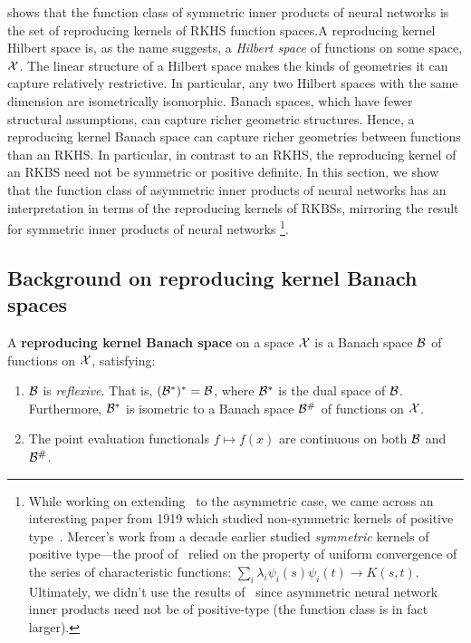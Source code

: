  shows that the function class of symmetric inner products of neural networks is the set of reproducing kernels of RKHS function spaces.A reproducing kernel Hilbert space is, as the name suggests, a \textit{Hilbert space} of functions on some space, ${\mathcal{X}}$. The linear structure of a Hilbert space makes the kinds of geometries it can capture relatively restrictive. In particular, any two Hilbert spaces with the same dimension are isometrically isomorphic. Banach spaces, which have fewer structural assumptions, can capture richer geometric structures. Hence, a reproducing kernel Banach space can capture richer geometries between functions than an RKHS. In particular, in contrast to an RKHS, the reproducing kernel of an RKBS need not be symmetric or positive definite. In this section, we show that the function class of asymmetric inner products of neural networks has an interpretation in terms of the reproducing kernels of RKBSs, mirroring the result for symmetric inner products of neural networks
\footnote{While working on extending~ to the asymmetric case, we came across an interesting paper from 1919 which studied non-symmetric kernels of positive type~\parencite{seelyNonSymmetricKernels1919}. Mercer's work from a decade earlier studied \textit{symmetric} kernels of positive type---the proof of~ relied on the property of uniform convergence of the series of characteristic functions: $\sum_i \lambda_i \psi_i(s)\psi_i(t) \to K(s,t)$. Ultimately, we didn't use the results of~\parencite{seelyNonSymmetricKernels1919} since asymmetric neural network inner products need not be of positive-type (the function class is in fact larger).}.

\subsection{Background on reproducing kernel Banach spaces}

\begin{definition}
    A \textbf{reproducing kernel Banach space} on a space ${\mathcal{X}}$ is a Banach space ${\mathcal{B}}$ of functions on ${\mathcal{X}}$, satisfying:
    \begin{enumerate}
        \item ${\mathcal{B}}$ is \textit{reflexive}. That is, $({\mathcal{B}}^*)^* = {\mathcal{B}}$, where ${\mathcal{B}}^*$ is the dual space of ${\mathcal{B}}$. Furthermore, ${\mathcal{B}}^*$ is isometric to a Banach space ${\mathcal{B}}^\#$ of functions on ${\mathcal{X}}$.
        \item The point evaluation functionals $f \mapsto f(x)$ are continuous on both ${\mathcal{B}}$ and ${\mathcal{B}}^\#$.
    \end{enumerate}
\end{definition}

